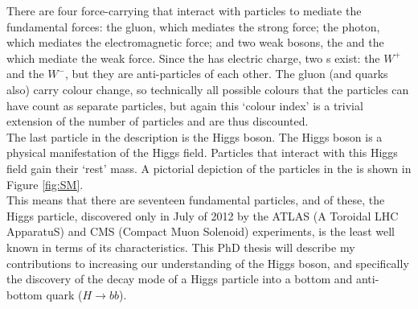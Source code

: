 There are four force-carrying  that interact with particles to mediate the fundamental forces: the gluon, which mediates the strong force; the photon, which mediates the electromagnetic force; and two weak bosons, the \W and the \Z which mediate the weak force. Since the \W has electric charge, two \w s exist: the $W^+$ and the $W^-$, but they are anti-particles of each other. The gluon (and quarks also) carry colour change, so technically all possible colours that the particles can have count as separate particles, but again this `colour index' is a trivial extension of the number of particles and are thus discounted. \\

The last particle in the \SM description is the Higgs boson. The Higgs boson is a physical manifestation of the Higgs field. Particles that interact with this Higgs field gain their `rest' mass. A pictorial depiction of the particles in the \SM is shown in Figure \ref{fig:SM}.\\

This means that there are seventeen fundamental particles, and of these, the Higgs particle, discovered only in July of 2012 by the ATLAS (A Toroidal LHC ApparatuS) \cite{ATLASHiggsDisc} and CMS (Compact Muon Solenoid) \cite{CMSHiggsDisc} experiments, is the least well known in terms of its characteristics. This PhD thesis will describe my contributions to increasing our understanding of the Higgs boson, and specifically the  discovery of the decay mode of a Higgs particle into a bottom and anti-bottom quark ($H\to bb$).